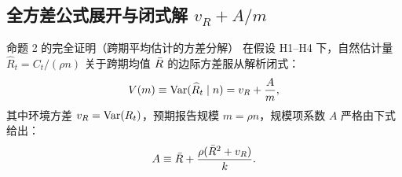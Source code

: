 \subsection{全方差公式展开与闭式解 $v_R + A/m$}

\begin{theorembox}{命题 2 的完全证明（跨期平均估计的方差分解）}
在假设 H1--H4 下，自然估计量 $\widehat{R}_t = C_t / (\rho n)$ 关于跨期均值 $\bar{R}$ 的边际方差服从解析闭式：
\begin{equation}
  V(m) \equiv \mathrm{Var}(\widehat{R}_t \mid n) = v_R + \frac{A}{m},
  \label{eq:var-closed}
\end{equation}
其中环境方差 $v_R = \mathrm{Var}(R_t)$，预期报告规模 $m = \rho n$，规模项系数 $A$ 严格由下式给出：
\begin{equation}
  A \equiv \bar{R} + \frac{\rho(\bar{R}^2 + v_R)}{k}.
  \label{eq:A-closed}
\end{equation}
\end{theorembox}

